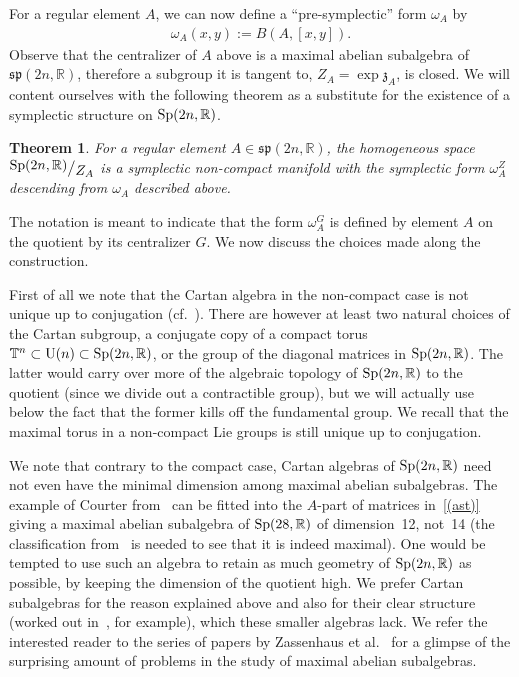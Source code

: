 \documentclass[pdftex]{sigma}
\numberwithin{equation}{section}
\newtheorem{Theorem}{Theorem}[section]
{ \theoremstyle{definition}
\newtheorem{Definition}[Theorem]{Definition}
\newtheorem{Example}[Theorem]{Example}
\newtheorem{Remark}[Theorem]{Remark} }
\newcommand{\bigslant}[2]{{\raisebox{.2em}{$#1$}\big/\raisebox{-.2em}{$#2$}}}
\begin{document}
For a regular element $A$, we can now define a ``pre-symplectic'' form $\omega_A$ by
\begin{gather*}
\omega_A(x,y):=B(A,[x,y]).
\end{gather*}
Observe that the centralizer of $A$ above is a maximal abelian subalgebra of $\mathfrak{sp}(2n,\mathbb{R})$, therefore a subgroup it is tangent to, $Z_A=\exp \mathfrak{z}_A$, is closed. We will content ourselves with the following theorem as a substitute for the existence of a symplectic structure on ${\rm Sp}(2n,\mathbb{R})$.
\begin{Theorem}\label{struktur}
For a regular element $A\in\mathfrak{sp}(2n,\mathbb{R})$, the homogeneous space $\bigslant{{\rm Sp}(2n,\mathbb{R})}{Z_A}$ is a symplectic non-compact manifold with the symplectic form $\omega^{Z}_{A}$ descending from $\omega_A$ described above.
\end{Theorem}
The notation is meant to indicate that the form $\omega^{G}_A$ is defined by element $A$ on the quotient by its centralizer $G$. We now discuss the choices made along the construction.
\begin{Remark}
First of all we note that the Cartan algebra in the non-compact case is not unique up to conjugation (cf.~\cite{sugiura}). There are however at least two natural choices of the Cartan subgroup, a conjugate copy of a compact torus $\mathbb{T}^n\subset {\rm U}(n)\subset {\rm Sp}(2n,\mathbb{R})$, or the group of the diagonal matrices in ${\rm Sp}(2n,\mathbb{R})$. The latter would carry over more of the algebraic topology of ${\rm Sp}(2n,\mathbb{R})$ to the quotient (since we divide out a contractible group), but we will actually use below the fact that the former kills off the fundamental group. We recall that the maximal torus in a non-compact Lie groups is still unique up to conjugation.
\end{Remark}
\begin{Remark}
We note that contrary to the compact case, Cartan algebras of ${\rm Sp}(2n,\mathbb{R})$ need not even have the minimal dimension among maximal abelian subalgebras. The example of Courter from~\cite{courter} can be fitted into the $A$-part of matrices in~\eqref{(ast)} giving a maximal abelian subalgebra of ${\rm Sp}(28,\mathbb{R})$ of dimension~12, not~14 (the classification from~\cite{masasp} is needed to see that it is indeed maximal). One would be tempted to use such an algebra to retain as much geometry of ${\rm Sp}(2n,\mathbb{R})$ as possible, by keeping the dimension of the quotient high. We prefer Cartan subalgebras for the reason explained above and also for their clear structure (worked out in~\cite{sugiura}, for example), which these smaller algebras lack. We refer the interested reader to the series of papers by Zassenhaus et al.\ \cite{masaupq,masaonc,tenodcourtera,masasp} for a glimpse of the surprising amount of problems in the study of maximal abelian subalgebras.
\end{Remark}
\end{document}
